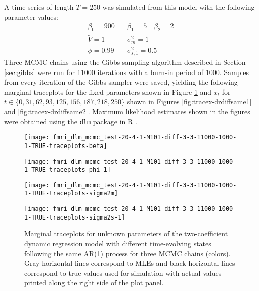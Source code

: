 \documentclass{article}
\begin{document}
A time series of length $T = 250$ was simulated from this model with the following parameter values:
\begin{align*}
\beta_0 = 900 &\quad \beta_1 = 5 \quad \beta_2 = 2 \\
\tilde{V} = 1 &\quad \sigma_m^2 = 1 \\
\phi = 0.99 &\quad \sigma^2_{s,1} = 0.5
\end{align*}
Three MCMC chains using the Gibbs sampling algorithm described in Section \ref{sec:gibbs} were run for 11000 iterations with a burn-in period of 1000. Samples from every iteration of the Gibbs sampler were saved, yielding the following marginal traceplots for the fixed parameters shown in Figure \ref{fig:tracetheta-drdiffsame} and $x_t$ for $t \in \{0, 31, 62, 93, 125, 156, 187, 218, 250\}$ shown in Figures \ref{fig:tracex-drdiffsame1} and \ref{fig:tracex-drdiffsame2}. Maximum likelihood estimates shown in the figures were obtained using the {\tt dlm} package in R \citep{petris2009dynamic}.

\begin{figure}[ht]
\begin{minipage}{0.5\linewidth}
\texttt{[image: fmri\_dlm\_mcmc\_test-20-4-1-M101-diff-3-3-11000-1000-1-TRUE-traceplots-beta]}
\end{minipage}
\begin{minipage}{0.5\linewidth}
\texttt{[image: fmri\_dlm\_mcmc\_test-20-4-1-M101-diff-3-3-11000-1000-1-TRUE-traceplots-phi-1]}
\end{minipage}
\begin{minipage}{0.5\linewidth}
\texttt{[image: fmri\_dlm\_mcmc\_test-20-4-1-M101-diff-3-3-11000-1000-1-TRUE-traceplots-sigma2m]}
\end{minipage}
\begin{minipage}{0.5\linewidth}
\texttt{[image: fmri\_dlm\_mcmc\_test-20-4-1-M101-diff-3-3-11000-1000-1-TRUE-traceplots-sigma2s-1]}
\end{minipage}
\caption{Marginal traceplots for unknown parameters of the two-coefficient dynamic regression model with different time-evolving states following the same AR(1) process for three MCMC chains (colors). Gray horizontal lines correspond to MLEs and black horizontal lines correspond to true values used for simulation with actual values printed along the right side of the plot panel.} \label{fig:tracetheta-drdiffsame}
\end{figure}
\end{document}
